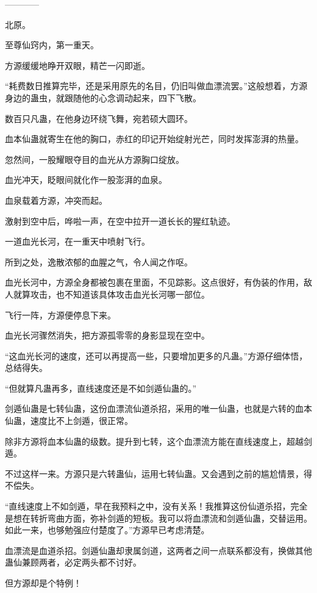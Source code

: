 
\begin{this_body}

------------

北原。

至尊仙窍内，第一重天。

方源缓缓地睁开双眼，精芒一闪即逝。

“耗费数日推算完毕，还是采用原先的名目，仍旧叫做血漂流罢。”这般想着，方源身边的蛊虫，就跟随他的心念调动起来，四下飞散。

数百只凡蛊，在他身边环绕飞舞，宛若硕大圆环。

血本仙蛊就寄生在他的胸口，赤红的印记开始绽射光芒，同时发挥澎湃的热量。

忽然间，一股耀眼夺目的血光从方源胸口绽放。

血光冲天，眨眼间就化作一股澎湃的血泉。

血泉载着方源，冲突而起。

激射到空中后，哗啦一声，在空中拉开一道长长的猩红轨迹。

一道血光长河，在一重天中喷射飞行。

所到之处，逸散浓郁的血腥之气，令人闻之作呕。

血光长河中，方源全身都被包裹在里面，不见踪影。这点很好，有伪装的作用，敌人就算攻击，也不知道该具体攻击血光长河哪一部位。

飞行一阵，方源便停息下来。

血光长河骤然消失，把方源孤零零的身影显现在空中。

“这血光长河的速度，还可以再提高一些，只要增加更多的凡蛊。”方源仔细体悟，总结得失。

“但就算凡蛊再多，直线速度还是不如剑遁仙蛊的。”

剑遁仙蛊是七转仙蛊，这份血漂流仙道杀招，采用的唯一仙蛊，也就是六转的血本仙蛊，速度比不上剑遁，很正常。

除非方源将血本仙蛊的级数。提升到七转，这个血漂流方能在直线速度上，超越剑遁。

不过这样一来。方源只是六转蛊仙，运用七转仙蛊。又会遇到之前的尴尬情景，得不偿失。

“直线速度上不如剑遁，早在我预料之中，没有关系！我推算这份仙道杀招，完全是想在转折弯曲方面，弥补剑遁的短板。我可以将血漂流和剑遁仙蛊，交替运用。如此一来，也够勉强应付楚度了。”方源早已考虑清楚。

血漂流是血道杀招。剑遁仙蛊却隶属剑道，这两者之间一点联系都没有，换做其他蛊仙兼顾两者，必定两头都不讨好。

但方源却是个特例！


\end{this_body}

